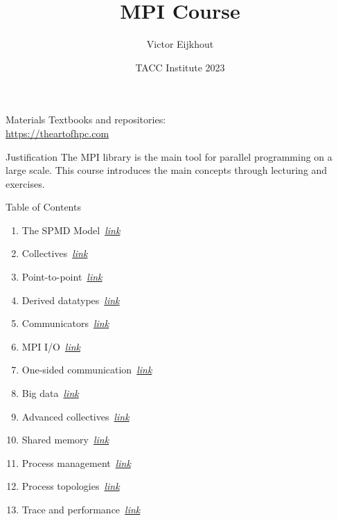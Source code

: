 \documentclass[10pt]{beamer}
\begin{document}


\author[Eijkhout]{Victor Eijkhout}
\date[2023]{TACC Institute 2023}
\title[MPI]{MPI Course}

\maketitle

\begin{frame}[containsverbatim]{Materials}
    Textbooks and repositories:\\
    \url{https://theartofhpc.com}
\end{frame}

\begin{frame}{Justification}
  The MPI library is the main tool
  for parallel programming on a large scale.
  This course introduces the main concepts
  through lecturing and exercises.
\end{frame}

\begin{frame}{Table of Contents}
  \begin{enumerate}
  \item The SPMD Model~\hyperlink{sec:spmd}{\textsl{link}}
  \item Collectives~\hyperlink{sec:collectives}{\textsl{link}}
  \item Point-to-point~\hyperlink{sec:ptp}{\textsl{link}}
  \item Derived datatypes~\hyperlink{sec:derived}{\textsl{link}}
  \item Communicators~\hyperlink{sec:comm}{\textsl{link}}
  \item MPI I/O~\hyperlink{sec:io}{\textsl{link}}
  \item One-sided communication~\hyperlink{sec:1side}{\textsl{link}}
  \item Big data~\hyperlink{sec:bigdata}{\textsl{link}}
  \item Advanced collectives~\hyperlink{sec:coll2}{\textsl{link}}
  \item Shared memory~\hyperlink{sec:shared}{\textsl{link}}
  \item Process management~\hyperlink{sec:process}{\textsl{link}}
  \item Process topologies~\hyperlink{sec:topo}{\textsl{link}}
  \item Trace and performance~\hyperlink{sec:trace}{\textsl{link}}
  \end{enumerate}
\end{frame}
\end{document}
